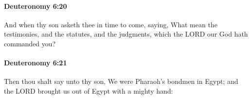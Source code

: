 		\paragraph{Deuteronomy 6:20} %
			\label{DEUTERONOMY-6-20}

			And when thy son asketh thee in time to come, saying, What mean the testimonies, and the statutes, and the judgments, which the LORD our God hath commanded you?


		\paragraph{Deuteronomy 6:21} %
			\label{DEUTERONOMY-6-21}

			Then thou shalt say unto thy son, We were Pharaoh's bondmen in Egypt; and the LORD brought us out of Egypt with a mighty hand:


